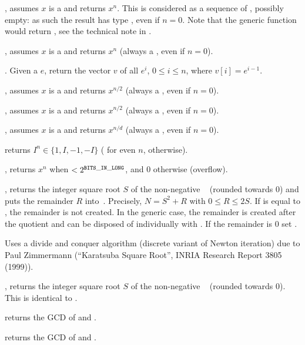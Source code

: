 , assumes $x$ is a  and returns
$x^n$. This is considered as a sequence of , possibly empty:
as such the result has type , even if $n = 0$.
Note that the generic function  would return ,
see the technical note in .

, assumes $x$ is a  and returns $x^n$
(always a , even if $n = 0$).

. Given a  $e$, return the vector
$v$ of all $e^i$, $0 \leq i \leq n$, where $v[i] = e^{i-1}$.

, assumes $x$ is a  and returns
$x^{n/2}$ (always a , even if $n = 0$).

, assumes $x$ is a  and returns
$x^{n/2}$ (always a , even if $n = 0$).

, assumes $x$ is a  and
returns $x^{n/d}$ (always a , even if $n = 0$).

 returns $I^n\in\{1,I,-1,-I\}$ ( for even $n$,
 otherwise).

, returns $x^n$ when $< 2^{\tt BITS\_IN\_LONG}$, and $0$
otherwise (overflow).

, returns the integer square root $S$ of
the non-negative ~ (rounded towards 0) and puts the remainder
$R$ into~. Precisely, $N = S^2 + R$ with $0\leq R \leq 2S$. If
 is equal to , the remainder is not created. In the generic
case, the remainder is created after the quotient and can be disposed of
individually with . If the remainder is $0$ set .

Uses a divide and conquer algorithm (discrete variant of Newton iteration)
due to Paul Zimmermann (``Karatsuba Square Root'', INRIA Research Report 3805
(1999)).

, returns the integer square root $S$ of
the non-negative ~ (rounded towards 0). This is identical
to .


 returns the GCD of  and .

 returns the GCD of  and .

